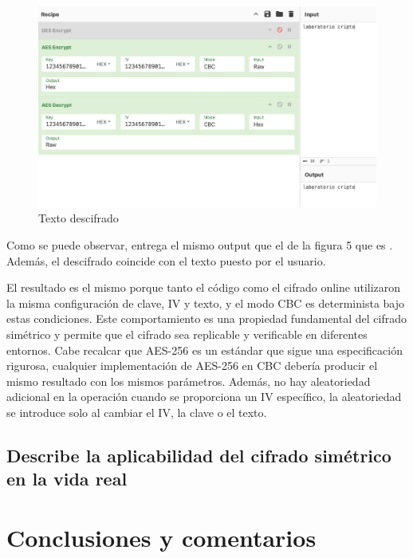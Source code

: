 \documentclass[letter,12pt]{article}
\begin{document}
\begin{figure}[H]
    \centering
    \includegraphics[width=1.0\linewidth]{imagenes/descript web aes.jpg}
    \caption{Texto descifrado}
    \label{fig:enter-label}
\end{figure}

Como se puede observar, entrega el mismo output que el de la figura 5 que es . Además, el descifrado coincide con el texto puesto por el usuario.

El resultado es el mismo porque tanto el código como el cifrado online utilizaron la misma configuración de clave, IV y texto, y el modo CBC es determinista bajo estas condiciones. Este comportamiento es una propiedad fundamental del cifrado simétrico y permite que el cifrado sea replicable y verificable en diferentes entornos. Cabe recalcar que AES-256 es un estándar que sigue una especificación rigurosa, cualquier implementación de AES-256 en CBC debería producir el mismo resultado con los mismos parámetros. Además, no hay aleatoriedad adicional en la operación cuando se proporciona un IV específico, la aleatoriedad se introduce solo al cambiar el IV, la clave o el texto.


\subsection{Describe la aplicabilidad del cifrado simétrico en la vida real}

\section*{Conclusiones y comentarios}

\end{document}
